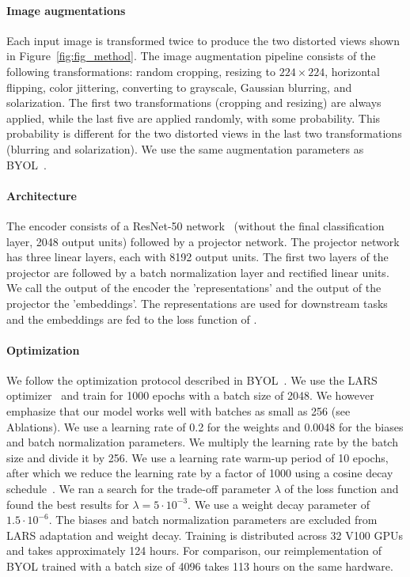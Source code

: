 \paragraph{Image augmentations} Each input image is transformed twice to produce the two distorted views shown in Figure~\ref{fig:fig_method}. The image augmentation pipeline consists of the following transformations: random cropping, resizing to $224 \times 224$, horizontal flipping, color jittering, converting to grayscale, Gaussian blurring, and solarization. The first two transformations (cropping and resizing) are always applied, while the last five are applied randomly, with some probability. This probability is different for the two distorted views in the last two transformations (blurring and solarization). We use the same augmentation parameters as \textsc{BYOL}~\cite{grill2020bootstrap}.

\paragraph{Architecture} 
The encoder consists of a ResNet-50 network~\cite{he2016deep} (without the final classification layer, 2048 output units) followed by a projector network. The projector network has three linear layers, each with 8192 output units. The first two layers of the projector are followed by a batch normalization layer and rectified linear units. We call the output of the encoder the 'representations' and the output of the projector the 'embeddings'. The representations are used for downstream tasks and the embeddings are fed to the loss function of \AlgoName{}.

\paragraph{Optimization} 
We follow the optimization protocol described in \textsc{BYOL}~\cite{grill2020bootstrap}. We use the LARS optimizer~\cite{you2017large} and train for 1000 epochs with a batch size of 2048. We however emphasize that our model works well with batches as small as 256 (see Ablations). We use a learning rate of 0.2 for the weights and 0.0048 for the biases and batch normalization parameters. We multiply the learning rate by the batch size and divide it by 256. We use a learning rate warm-up period of 10 epochs, after which we reduce the learning rate by a factor of 1000 using a cosine decay schedule~\cite{loshchilov2016sgdr}. We ran a search for the trade-off parameter $\lambda$ of the loss function and found the best results for $\lambda = 5\cdot10^{-3}$. We use a weight decay parameter of $1.5 \cdot 10^{-6}$. The biases and batch normalization parameters are excluded from LARS adaptation and weight decay. Training is distributed across 32 V100 GPUs and takes approximately 124 hours. For comparison, our reimplementation of \textsc{BYOL} trained with a batch size of 4096 takes 113 hours on the same hardware.